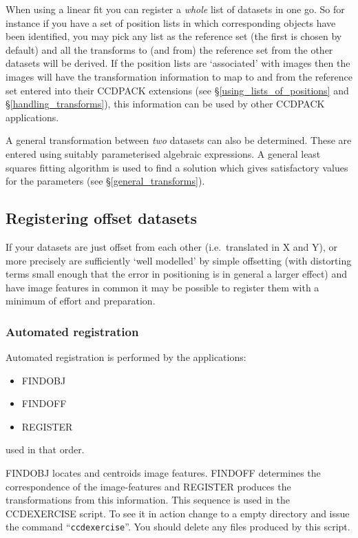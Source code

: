 \documentclass[twoside,11pt]{article}
\newcommand{\hyperref}[4]{#2\ref{#4}#3}
\newcommand{\htmlref}[2]{#1}
\newcommand{\xlabel}[1]{}
\renewcommand{\_}{\texttt{\symbol{95}}}
\newcommand{\text}[1]{{\small \tt #1}}
\newcommand{\routine}[1]{{\sc #1}}
\newcommand{\xroutine}[1]{\htmlref{{\sc #1}}{#1}}
\begin{document}
When using a linear fit you can register a {\em whole} list of datasets
in one go. So for instance if you have a set of position lists in which
corresponding objects have been identified, you may pick any list as the
reference set (the first is chosen by default) and all the transforms to
(and from) the reference set from the other datasets will be
derived. If the position lists are `associated' with images then the
images will have the transformation information to map to and from the
reference set entered into their CCDPACK extensions (see
\hyperref{using lists of positions}{\S}{}{using_lists_of_positions}
and
\hyperref{handling transforms}{\S}{}{handling_transforms}), this
information can be used by other CCDPACK applications.

A general transformation between {\em two} datasets can also be
determined. These are entered using suitably parameterised algebraic
expressions. A general least squares fitting algorithm is used to find
a solution which gives satisfactory values for the parameters (see
\hyperref{general transformations}{\S}{}{general_transforms}).

\subsection{\xlabel{offsetdata}Registering offset datasets}

If your datasets are just offset from each other (i.e.\ translated in X
and Y), or more precisely are sufficiently `well modelled' by simple
offsetting (with distorting terms small enough that the error in
positioning is in general a larger effect) and have image features in
common it may be possible to register them with a minimum of effort and
preparation.

\subsubsection{\xlabel{automatedregistration}Automated registration}
Automated registration is performed by the applications:
\begin{itemize}
\item \xroutine{FINDOBJ}
\item \xroutine{FINDOFF}
\item \xroutine{REGISTER}
\end{itemize}
used in that order.

\routine{FINDOBJ} locates and centroids image features. \routine{FINDOFF} determines the
correspondence of the image-features and \routine{REGISTER} produces the
transformations from this information. This sequence is used in the
CCDEXERCISE script. To see it in action change to a empty directory and
issue the command ``\text{ccdexercise}''. You should delete any
files produced by this script.
\end{document}
